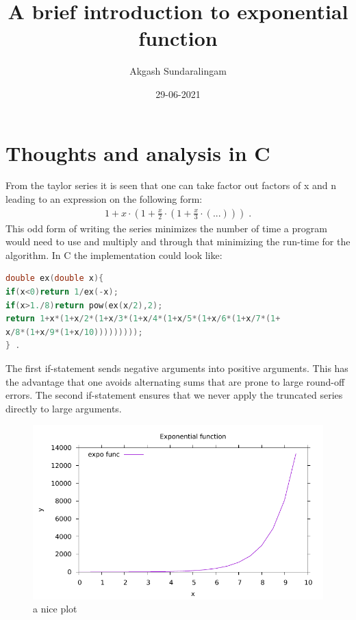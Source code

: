\documentclass{article}
\title{A brief introduction to exponential function}
\author{Akgash Sundaralingam}
\date{29-06-2021}
\begin{document}
\maketitle
\section{Thoughts and analysis in C}
From the taylor series it is seen that one can take factor out factors of x and 
n leading to an expression on the following form:
\begin{align}
1+x\cdot(1+\frac{x}{2}\cdot(1+\frac{x}{3}\cdot(...))) \; .
\end{align}
This odd form of writing the series minimizes the number of time a program would need to use and multiply and through that minimizing the run-time for the algorithm.
In C the implementation could look like:
\begin{lstlisting}[language=C]
double ex(double x){
if(x<0)return 1/ex(-x);
if(x>1./8)return pow(ex(x/2),2);
return 1+x*(1+x/2*(1+x/3*(1+x/4*(1+x/5*(1+x/6*(1+x/7*(1+
x/8*(1+x/9*(1+x/10)))))))));
} .
\end{lstlisting}
The first if-statement sends negative arguments into positive arguments. This has the advantage that one avoids alternating sums that are prone to
large round-off errors. The second if-statement ensures that we never apply the truncated series directly to large arguments.
\newpage
\begin{figure}[ht!]
    \centering
    \includegraphics[width=\textwidth]{exp1.pdf}
    \caption{a nice plot}
    \label{fig:exp}
\end{figure}
\end{document}
